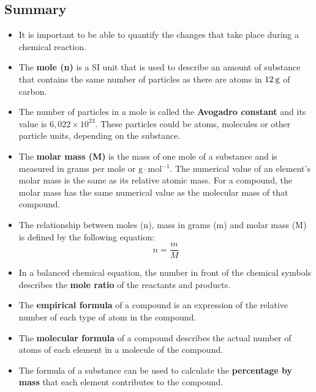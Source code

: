             \subsection{ Summary}
            \nopagebreak
      \label{m38712*id285735}\begin{itemize}[noitemsep]
            \label{m38712*uid107}\item It is important to be able to quantify the changes that take place during a chemical reaction.
\label{m38712*uid108}\item The \textbf{mole (n)} is a SI unit that is used to describe an amount of substance that contains the same number of particles as there are atoms in $12\phantom{\rule{2pt}{0ex}}\mathrm{g}$ of carbon.
\label{m38712*uid109}\item The number of particles in a mole is called the \textbf{Avogadro constant} and its value is $6,022\ensuremath{\times}{10}^{23}$. These particles could be atoms, molecules or other particle units, depending on the substance.
\label{m38712*uid110}\item The \textbf{molar mass (M)} is the mass of one mole of a substance and is measured in grams per mole or $\mathrm{g}\ensuremath{\cdot}\mathrm{mol}{}^{-1}$. The numerical value of an element's molar mass is the same as its relative atomic mass. For a compound, the molar mass has the same numerical value as the molecular mass of that compound.
\label{m38712*uid111}\item The relationship between moles (n), mass in grams (m) and molar mass (M) is defined by the following equation:
\label{m38712*id285862}\nopagebreak\noindent{}
    \begin{equation}
    n=\frac{m}{M}\tag{18.53}
      \end{equation}
    \label{m38712*uid112}\item In a balanced chemical equation, the number in front of the chemical symbols describes the \textbf{mole ratio} of the reactants and products.
\label{m38712*uid113}\item The \textbf{empirical formula} of a compound is an expression of the relative number of each type of atom in the compound.
\label{m38712*uid114}\item The \textbf{molecular formula} of a compound describes the actual number of atoms of each element in a molecule of the compound.
\label{m38712*uid115}\item The formula of a substance can be used to calculate the \textbf{percentage by mass} that each element contributes to the compound.

\end{itemize}
